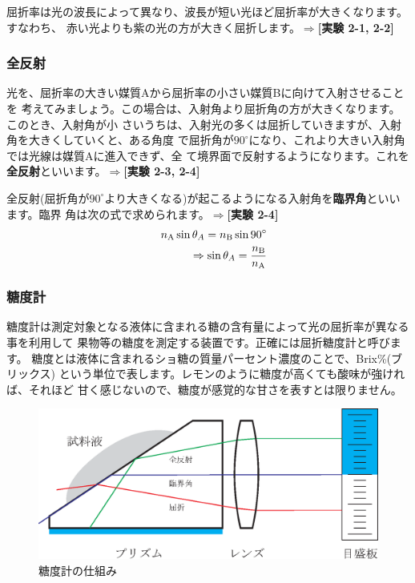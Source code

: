 屈折率は光の波長によって異なり、波長が短い光ほど屈折率が大きくなります。すなわち、
赤い光よりも紫の光の方が大きく屈折します。$\Rightarrow${\bf [実験 2-1, 2-2]}

\subsubsection{全反射}

光を、屈折率の大きい媒質Aから屈折率の小さい媒質Bに向けて入射させることを
考えてみましょう。この場合は、入射角より屈折角の方が大きくなります。このとき、入射角が小
さいうちは、入射光の多くは屈折していきますが、入射角を大きくしていくと、ある角度
で屈折角が$90^\circ$になり、これより大きい入射角では光線は媒質Aに進入できず、全
て境界面で反射するようになります。これを{\bf 全反射}といいます。$\Rightarrow${\bf [実験 2-3, 2-4]}

全反射(屈折角が$90^\circ$より大きくなる)が起こるようになる入射角を{\bf 臨界角}といいます。臨界
角は次の式で求められます。$\Rightarrow${\bf[実験 2-4]} 
\begin{eqnarray}
&&n_{\rm A}\sin\theta_A = n_{\rm B} \sin 90^\circ\nonumber\\
&& \Rightarrow \sin\theta_A = \frac{n_{\rm B}}{n_{\rm A}}\nonumber
\end{eqnarray}

\subsubsection{糖度計}

糖度計は測定対象となる液体に含まれる糖の含有量によって光の屈折率が異なる事を利用して
果物等の糖度を測定する装置です。正確には屈折糖度計と呼びます。
糖度とは液体に含まれるショ糖の質量パーセント濃度のことで、Brix\%(ブリックス)
という単位で表します。レモンのように糖度が高くても酸味が強ければ、それほど
甘く感じないので、糖度が感覚的な甘さを表すとは限りません。


\begin{figure}[h]
\begin{center}
\includegraphics[scale=0.75]{02_Refraction/brix.eps}
\end{center}
\caption{糖度計の仕組み}
\end{figure}

